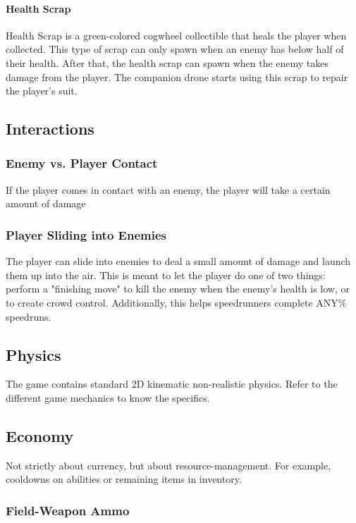 \documentclass[12pt]{article}
\begin{document}
\paragraph{Health Scrap}

Health Scrap is a green-colored cogwheel collectible that heals the player when collected. This type of scrap can only spawn when an enemy has below half of their health. After that, the health scrap can spawn when the enemy takes damage from the player. The companion drone starts using this scrap to repair the player's suit. 

\subsection{Interactions}

\subsubsection{Enemy vs. Player Contact}

If the player comes in contact with an enemy, the player will take a certain amount of damage

\subsubsection{Player Sliding into Enemies}

The player can slide into enemies to deal a small amount of damage and launch them up into the air. This is meant to let the player do one of two things: perform a "finishing move" to kill the enemy when the enemy's health is low, or to create crowd control. Additionally, this helps speedrunners complete ANY\% speedruns. 

\subsection{Physics}

The game contains standard 2D kinematic non-realistic physics. Refer to the different game mechanics to know the specifics.

\subsection{Economy}

Not strictly about currency, but about resource-management. For example, cooldowns on abilities or remaining items in inventory. 

\subsubsection{Field-Weapon Ammo}
\end{document}
